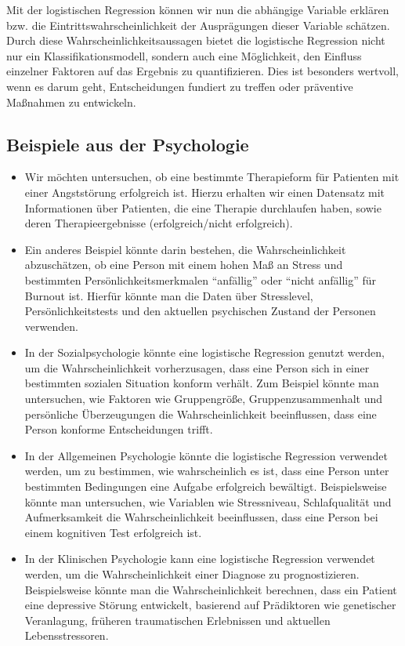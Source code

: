\documentclass[
]{article}
\begin{document}
Mit der logistischen Regression können wir nun die abhängige Variable erklären bzw. die Eintrittswahrscheinlichkeit der Ausprägungen dieser Variable schätzen. Durch diese Wahrscheinlichkeitsaussagen bietet die logistische Regression nicht nur ein Klassifikationsmodell, sondern auch eine Möglichkeit, den Einfluss einzelner Faktoren auf das Ergebnis zu quantifizieren. Dies ist besonders wertvoll, wenn es darum geht, Entscheidungen fundiert zu treffen oder präventive Maßnahmen zu entwickeln.

\subsection{Beispiele aus der Psychologie}\label{beispiele-aus-der-psychologie}

\begin{itemize}
\item
  Wir möchten untersuchen, ob eine bestimmte Therapieform für Patienten mit einer Angststörung erfolgreich ist. Hierzu erhalten wir einen Datensatz mit Informationen über Patienten, die eine Therapie durchlaufen haben, sowie deren Therapieergebnisse (erfolgreich/nicht erfolgreich).
\item
  Ein anderes Beispiel könnte darin bestehen, die Wahrscheinlichkeit abzuschätzen, ob eine Person mit einem hohen Maß an Stress und bestimmten Persönlichkeitsmerkmalen ``anfällig'' oder ``nicht anfällig'' für Burnout ist. Hierfür könnte man die Daten über Stresslevel, Persönlichkeitstests und den aktuellen psychischen Zustand der Personen verwenden.
\item
  In der Sozialpsychologie könnte eine logistische Regression genutzt werden, um die Wahrscheinlichkeit vorherzusagen, dass eine Person sich in einer bestimmten sozialen Situation konform verhält. Zum Beispiel könnte man untersuchen, wie Faktoren wie Gruppengröße, Gruppenzusammenhalt und persönliche Überzeugungen die Wahrscheinlichkeit beeinflussen, dass eine Person konforme Entscheidungen trifft.
\item
  In der Allgemeinen Psychologie könnte die logistische Regression verwendet werden, um zu bestimmen, wie wahrscheinlich es ist, dass eine Person unter bestimmten Bedingungen eine Aufgabe erfolgreich bewältigt. Beispielsweise könnte man untersuchen, wie Variablen wie Stressniveau, Schlafqualität und Aufmerksamkeit die Wahrscheinlichkeit beeinflussen, dass eine Person bei einem kognitiven Test erfolgreich ist.
\item
  In der Klinischen Psychologie kann eine logistische Regression verwendet werden, um die Wahrscheinlichkeit einer Diagnose zu prognostizieren. Beispielsweise könnte man die Wahrscheinlichkeit berechnen, dass ein Patient eine depressive Störung entwickelt, basierend auf Prädiktoren wie genetischer Veranlagung, früheren traumatischen Erlebnissen und aktuellen Lebensstressoren.
\end{itemize}
\end{document}
